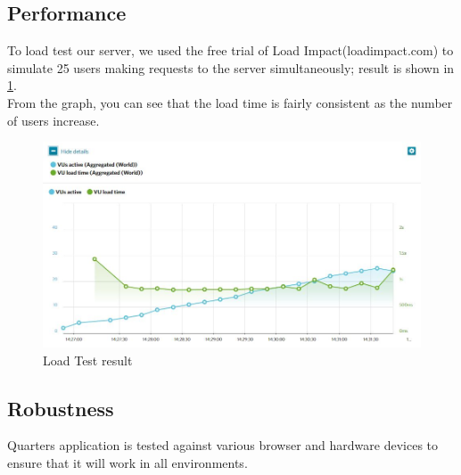 \documentclass[12pt]{article}
\begin{document}
\subsection{Performance}
To load test our server, we used the free trial of Load Impact(loadimpact.com) to simulate 25 users making requests to the server simultaneously; result is shown in \ref{fig:loadTest}.
\\From the graph, you can see that the load time is fairly consistent as the number of users increase.

\begin{figure}[h]
    \centering
    \includegraphics[width=1\textwidth]{figures/loadtest.JPG}
    \caption{Load Test result}
    \label{fig:loadTest}
\end{figure}


\subsection{Robustness}
Quarters application is tested against various browser and hardware devices to ensure that it will work in all environments.
\end{document}
